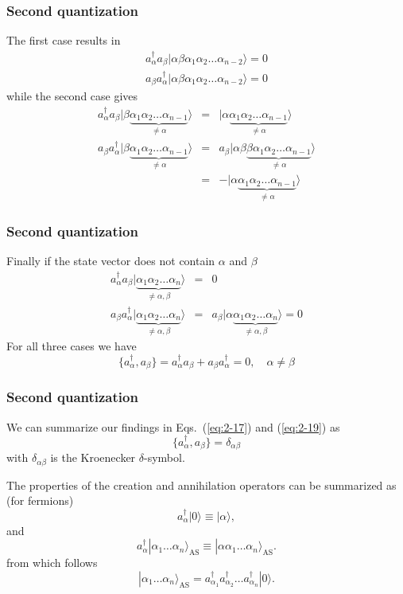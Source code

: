 \documentclass[compress]{beamer}
\newcommand*{\ket}[1]{|#1\rangle}
\begin{document}
{
  \frametitle{Second quantization}
\begin{small}
{\scriptsize
The first case results in
\begin{eqnarray}
	a_\alpha^\dagger a_\beta \ket{\alpha\beta\alpha_1\alpha_2 \dots \alpha_{n-2}} = 0 \nonumber \\
	a_\beta a_\alpha^\dagger \ket{\alpha\beta\alpha_1\alpha_2 \dots \alpha_{n-2}} = 0 \label{eq:2-18a}
\end{eqnarray}
while the second case gives
\begin{eqnarray}
	 a_\alpha^\dagger a_\beta \ket{\beta \underbrace{\alpha_1\alpha_2 \dots \alpha_{n-1}}_{\neq \alpha}} &=& 
	 	\ket{\alpha \underbrace{\alpha_1\alpha_2 \dots \alpha_{n-1}}_{\neq  \alpha}} \nonumber \\
	a_\beta a_\alpha^\dagger \ket{\beta \underbrace{\alpha_1\alpha_2 \dots \alpha_{n-1}}_{\neq \alpha}} &=&
		a_\beta \ket{\alpha\beta\underbrace{\beta \alpha_1\alpha_2 \dots \alpha_{n-1}}_{\neq \alpha}} \nonumber \\
	&=& - \ket{\alpha\underbrace{\alpha_1\alpha_2 \dots \alpha_{n-1}}_{\neq \alpha}} \label{eq:2-18b}
\end{eqnarray}
}
\end{small}
}
\frame
{
  \frametitle{Second quantization}
\begin{small}
{\scriptsize
Finally if the state vector does not contain $\alpha$ and $\beta$
\begin{eqnarray}
	a_\alpha^\dagger a_\beta \ket{\underbrace{\alpha_1\alpha_2 \dots \alpha_{n}}_{\neq \alpha,\beta}} &=& 0 \nonumber \\
	a_\beta a_\alpha^\dagger \ket{\underbrace{\alpha_1\alpha_2 \dots \alpha_{n}}_{\neq \alpha,\beta}} &=& 
		a_\beta \ket{\alpha \underbrace{\alpha_1\alpha_2 \dots \alpha_{n}}_{\neq \alpha,\beta}} = 0 \label{eq:2-18c}
\end{eqnarray}
For all three cases we have
\begin{equation}
	\{a_\alpha^\dagger,a_\beta \} = a_\alpha^\dagger a_\beta + a_\beta a_\alpha^\dagger = 0, \quad \alpha \neq \beta \label{eq:2-19}
\end{equation}
}
\end{small}
}
\frame
{
  \frametitle{Second quantization}
\begin{small}
{\scriptsize
We can summarize  our findings in Eqs.~(\ref{eq:2-17}) and (\ref{eq:2-19}) as 
\begin{equation}
	\{a_\alpha^\dagger,a_\beta \} = \delta_{\alpha\beta} \label{eq:2-20}
\end{equation}
with  $\delta_{\alpha\beta}$ is the Kroenecker $\delta$-symbol.

The properties of the creation and annihilation operators can be summarized as (for fermions)
\[
	a_\alpha^\dagger\ket{0} \equiv  \ket{\alpha},
\]
and 
\[
	a_\alpha^\dagger\ket{\alpha_1\dots \alpha_n}_{\mathrm{\mathrm{AS}}} \equiv  \ket{\alpha\alpha_1\dots \alpha_n}_{\mathrm{\mathrm{AS}}}. 
\]
from which follows
\[
        \ket{\alpha_1\dots \alpha_n}_{\mathrm{\mathrm{AS}}} = a_{\alpha_1}^\dagger a_{\alpha_2}^\dagger \dots a_{\alpha_n}^\dagger \ket{0}.
\]
}
\end{small}
}
\end{document}
